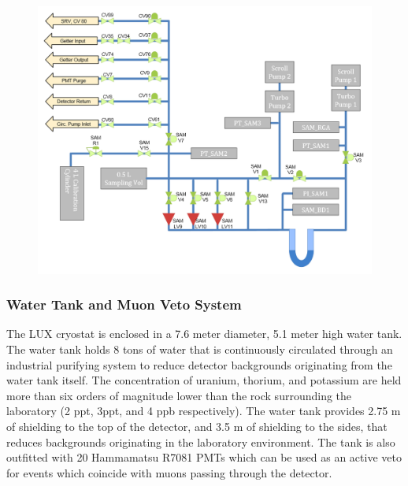 \documentclass[a4paper,12pt]{article}
\begin{document}
 \begin{figure} [!h]
\includegraphics[scale=.3]{SAMdiagram.png} 
\label{LuxSamSystem}
\end{figure}


\subsubsection{Water Tank and Muon Veto System}

The LUX cryostat is enclosed in a 7.6 meter diameter, 5.1 meter high water tank.  The water tank holds 8 tons of water that is continuously circulated through an industrial purifying system to reduce detector backgrounds originating from the water tank itself.  The concentration of uranium, thorium, and potassium are held more than six orders of magnitude lower than the rock surrounding the laboratory (2 ppt, 3ppt, and 4 ppb respectively). The water tank provides 2.75 m of shielding to the top of the detector, and 3.5 m of shielding to the sides, that reduces backgrounds originating in the laboratory environment.  The tank is also outfitted with 20 Hammamatsu R7081 PMTs which can be used as an active veto for events which coincide with muons passing through the detector.
\end{document}
